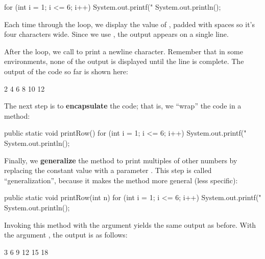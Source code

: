 \begin{code}
for (int i = 1; i <= 6; i++) {
    System.out.printf("%
}
System.out.println();
\end{code}

%

Each time through the loop, we display the value of , padded with spaces so it's four characters wide.
Since we use , the output appears on a single line.

After the loop, we call  to print a newline character.
Remember that in some environments, none of the output is displayed until the line is complete.
The output of the code so far is shown here:

\begin{stdout}
   2   4   6   8  10  12
\end{stdout}


The next step is to {\bf encapsulate} the code; that is, we ``wrap'' the code in a method:

\begin{code}
public static void printRow() {
    for (int i = 1; i <= 6; i++) {
        System.out.printf("%
    }
    System.out.println();
}
\end{code}


Finally, we {\bf generalize} the method to print multiples of other numbers by replacing the constant value  with a parameter .
This step is called ``generalization'', because it makes the method more general (less specific):

\begin{code}
public static void printRow(int n) {
    for (int i = 1; i <= 6; i++) {
        System.out.printf("%
    }
    System.out.println();
}
\end{code}

Invoking this method with the argument  yields the same output as before.
With the argument , the output is as follows:

\begin{stdout}
   3   6   9  12  15  18
\end{stdout}

